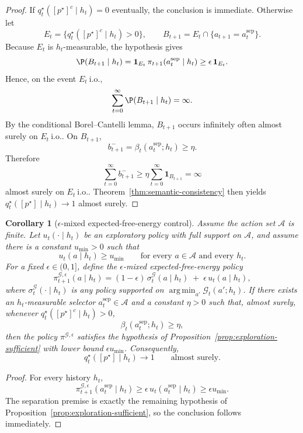 \documentclass[11pt]{article}
\newtheorem{corollary}[definition]{Corollary}
\theoremstyle{remark}
\newcommand{\Acal}{\mathcal{A}}
\newcommand{\Gcal}{\mathcal{G}}
\newcommand{\argmin}{\mathop{\mathrm{arg\,min}}}
\begin{document}
\begin{proof}
If \(q_t^\star([p^\star]^c\mid h_t)=0\) eventually, the conclusion is immediate. Otherwise let
\[
E_t = \{q_t^\star([p^\star]^c\mid h_t)>0\},
\qquad
B_{t+1} = E_t \cap \{a_{t+1}=a_t^{\mathrm{sep}}\}.
\]
Because \(E_t\) is \(h_t\)-measurable, the hypothesis gives
\[
\P(B_{t+1}\mid h_t)
=
\mathbf{1}_{E_t}\,\pi_{t+1}(a_t^{\mathrm{sep}}\mid h_t)
\ge
\epsilon\,\mathbf{1}_{E_t}.
\]
Hence, on the event \(E_t\ \text{i.o.}\),
\[
\sum_{t=0}^{\infty} \P(B_{t+1}\mid h_t) = \infty.
\]
By the conditional Borel--Cantelli lemma, \(B_{t+1}\) occurs infinitely often almost surely on \(E_t\ \text{i.o.}\). On \(B_{t+1}\),
\[
b_{t+1}^- = \beta_t(a_t^{\mathrm{sep}};h_t)\ge \eta.
\]
Therefore
\[
\sum_{t=0}^{\infty} b_{t+1}^- \ge \eta \sum_{t=0}^{\infty} \mathbf{1}_{B_{t+1}} = \infty
\]
almost surely on \(E_t\ \text{i.o.}\). Theorem~\ref{thm:semantic-consistency} then yields \(q_t^\star([p^\star]\mid h_t)\to 1\) almost surely.
\end{proof}

\begin{corollary}[\(\epsilon\)-mixed expected-free-energy control]
\label{cor:gcal-mixed}
Assume the action set \(\Acal\) is finite. Let \(u_t(\cdot\mid h_t)\) be an exploratory policy with full support on \(\Acal\), and assume there is a constant \(u_{\min}>0\) such that
\[
u_t(a\mid h_t)\ge u_{\min}
\qquad\text{for every } a\in\Acal \text{ and every } h_t.
\]
For a fixed \(\epsilon\in(0,1]\), define the \(\epsilon\)-mixed expected-free-energy policy
\[
\pi_{t+1}^{\Gcal,\epsilon}(a\mid h_t)
=
(1-\epsilon)\,\sigma_t^{\Gcal}(a\mid h_t)
\;+\;
\epsilon\,u_t(a\mid h_t),
\]
where \(\sigma_t^{\Gcal}(\cdot\mid h_t)\) is any policy supported on \(\argmin_{a'} \Gcal_t(a';h_t)\). If there exists an \(h_t\)-measurable selector \(a_t^{\mathrm{sep}}\in\Acal\) and a constant \(\eta>0\) such that, almost surely, whenever \(q_t^\star([p^\star]^c\mid h_t)>0\),
\[
\beta_t(a_t^{\mathrm{sep}};h_t)\ge \eta,
\]
then the policy \(\pi^{\Gcal,\epsilon}\) satisfies the hypothesis of Proposition~\ref{prop:exploration-sufficient} with lower bound \(\epsilon u_{\min}\). Consequently,
\[
q_t^\star([p^\star]\mid h_t)\to 1
\qquad\text{almost surely.}
\]
\end{corollary}

\begin{proof}
For every history \(h_t\),
\[
\pi_{t+1}^{\Gcal,\epsilon}(a_t^{\mathrm{sep}}\mid h_t)
\ge
\epsilon\,u_t(a_t^{\mathrm{sep}}\mid h_t)
\ge
\epsilon u_{\min}.
\]
The separation premise is exactly the remaining hypothesis of Proposition~\ref{prop:exploration-sufficient}, so the conclusion follows immediately.
\end{proof}
\end{document}
